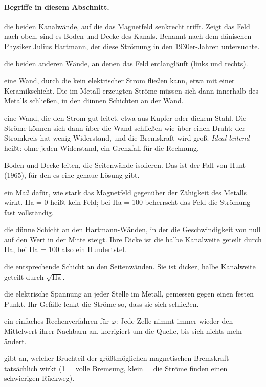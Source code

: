 \paragraph{Begriffe in diesem Abschnitt.}
\begin{description}\itemsep2pt
\item[Hartmann-Wände] die beiden Kanalwände, auf die das Magnetfeld senkrecht trifft. Zeigt das Feld nach oben, sind
  es Boden und Decke des Kanals. Benannt nach dem dänischen Physiker Julius Hartmann, der diese Strömung in den 1930er-Jahren untersuchte.
\item[Seitenwände] die beiden anderen Wände, an denen das Feld entlangläuft (links und rechts).
\item[isolierende Wand] eine Wand, durch die kein elektrischer Strom fließen kann, etwa mit einer Keramikschicht.
  Die im Metall erzeugten Ströme müssen sich dann innerhalb des Metalls schließen, in den dünnen Schichten an der Wand.
\item[leitende Wand] eine Wand, die den Strom gut leitet, etwa aus Kupfer oder dickem Stahl. Die Ströme können sich
  dann über die Wand schließen wie über einen Draht; der Stromkreis hat wenig Widerstand, und die Bremskraft wird groß.
  \emph{Ideal leitend} heißt: ohne jeden Widerstand, ein Grenzfall für die Rechnung.
\item[leitende Hartmann-Wände] Boden und Decke leiten, die Seitenwände isolieren. Das ist der Fall von Hunt (1965), für
  den es eine genaue Lösung gibt.
\item[Hartmann-Zahl Ha] ein Maß dafür, wie stark das Magnetfeld gegenüber der Zähigkeit des Metalls wirkt. Ha = 0 heißt
  kein Feld; bei Ha = 100 beherrscht das Feld die Strömung fast vollständig.
\item[Hartmann-Schicht] die dünne Schicht an den Hartmann-Wänden, in der die Geschwindigkeit von null auf den Wert in
  der Mitte steigt. Ihre Dicke ist die halbe Kanalweite geteilt durch Ha, bei Ha = 100 also ein Hundertstel.
\item[Seitenschicht] die entsprechende Schicht an den Seitenwänden. Sie ist dicker, halbe Kanalweite geteilt durch
  $\sqrt{\mathrm{Ha}}$.
\item[Potential $\varphi$] die elektrische Spannung an jeder Stelle im Metall, gemessen gegen einen festen Punkt. Ihr
  Gefälle lenkt die Ströme so, dass sie sich schließen.
\item[Jacobi-Schritt] ein einfaches Rechenverfahren für $\varphi$: Jede Zelle nimmt immer wieder den Mittelwert ihrer
  Nachbarn an, korrigiert um die Quelle, bis sich nichts mehr ändert.
\item[Druckverlustbeiwert $k_p$] gibt an, welcher Bruchteil der größtmöglichen magnetischen Bremskraft tatsächlich wirkt
  (1 = volle Bremsung, klein = die Ströme finden einen schwierigen Rückweg).
\end{description}

